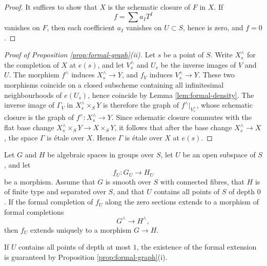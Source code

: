 \begin{proof}
It suffices to show that $X$ is the schematic closure of $F$ in $X$. If
\[
  f=\sum a_I T^I
\]
vanishes on $F$, then each coefficient $a_I$ vanishes on $U\subset S$, hence is zero, and $f=0$.
\end{proof}

\begin{proof}[Proof of Proposition \ref{prop:formal-graph}(ii)]
Let $s$ be a point of $S$. Write $X_s^\wedge$ for the completion of $X$ at $e(s)$, and let $V_s^\wedge$ and $U_s$ be the inverse images of $V$ and $U$. The morphism $f^\wedge$ induces $X_s^\wedge\to Y$, and $f_V$ induces $V_s^\wedge\to Y$. These two morphisms coincide on a closed subscheme containing all infinitesimal neighbourhoods of $e(U_s)$, hence coincide by Lemma \ref{lem:formal-density}. The inverse image of $\Gamma_V$ in $X_s^\wedge\times_S Y$ is therefore the graph of $f^\wedge|_{V_s^\wedge}$, whose schematic closure is the graph of $f^\wedge:X_s^\wedge\to Y$. Since schematic closure commutes with the flat base change $X_s^\wedge\times_S Y\to X\times_S Y$, it follows that after the base change $X_s^\wedge\to X$, the space $\Gamma$ is étale over $X$. Hence $\Gamma$ is étale over $X$ at $e(s)$.
\end{proof}

\begin{corollary}
Let $G$ and $H$ be algebraic spaces in groups over $S$, let $U$ be an open subspace of $S$, and let
\[
  f_U:G_U\longrightarrow H_U
\]
be a morphism. Assume that $G$ is smooth over $S$ with connected fibres, that $H$ is of finite type and separated over $S$, and that $U$ contains all points of $S$ of depth $0$. If the formal completion of $f_U$ along the zero sections extends to a morphism of formal completions
\[
  G^\wedge\longrightarrow H^\wedge,
\]
then $f_U$ extends uniquely to a morphism $G\to H$.
\end{corollary}

If $U$ contains all points of depth at most $1$, the existence of the formal extension is guaranteed by Proposition \ref{prop:formal-graph}(i).

